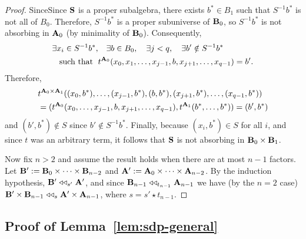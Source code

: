 \begin{proof}
{  Since}{Since}
  $\mathbf{S}$ is a proper subalgebra, there exists $b^* \in B_1$ such that 
  $S^{-1}b^*$ is not all of $B_0$.
  Therefore, $S^{-1}b^*$
  is a proper subuniverse of $\mathbf{B}_0$, so $S^{-1}b^*$ is not absorbing in $\mathbf{A}_0$
  (by minimality of $\mathbf{B}_0$). 
  Consequently,
  \begin{align*}
    \exists x_i \in S^{-1}b^*, &\quad \exists b\in B_0,
    \quad \exists j< q, \quad \exists  b'\notin S^{-1}b^* \\
    \text{ such that }  \;& t^{\mathbf{A}_0}(x_0, x_1, \dots, x_{j-1}, b, x_{j+1}, \dots, x_{q-1}) = b'.
  \end{align*}
  Therefore,
  \begin{align*}
    &t^{\bA_0\times \bA_1}((x_0,b^*), %
    \dots, (x_{j-1}, b^*), (b, b^*), (x_{j+1}, b^*), \dots, (x_{q-1}, b^*))\\
    &= (t^{\bA_0}(x_0,%
    \dots, x_{j-1}, b, x_{j+1}, \dots, x_{q-1}), t^{\bA_1}(b^*, \dots, b^*))= (b', b^*)
  \end{align*}
  and $(b', b^*)\notin S$ since $b' \notin S^{-1}b^*$.
  Finally, because $(x_i, b^*) \in S$ for all $i$, and since $t$ was an
  arbitrary term, it follows that $\mathbf{S}$ is not absorbing in $\mathbf{B}_0\times \mathbf{B}_1$.

  Now fix $n>2$ and assume the result holds when there are at most $n-1$
  factors.
  Let $\mathbf{B}' := \mathbf{B}_0 \times \cdots \times \mathbf{B}_{n-2}$ and
  $\mathbf{A}' := \mathbf{A}_0\times \cdots \times \mathbf{A}_{n-2}$. By the induction hypothesis, 
  $\mathbf{B}' \mathrel{\triangleleft\triangleleft}_{s'} \mathbf{A}'$, and since
  $\mathbf{B}_{n-1} \mathrel{\triangleleft\triangleleft}_{t_{n-1}} \mathbf{A}_{n-1}$ we have (by 
  the $n=2$ case) 
  $\mathbf{B}' \times \mathbf{B}_{n-1} \mathrel{\triangleleft\triangleleft}_s \mathbf{A}'\times \mathbf{A}_{n-1}$,
  where $s = s' \star t_{n-1}$.
\end{proof}

\subsection{Proof of Lemma~\ref{lem:sdp-general}}
\label{sec:proof-lemma-sdp-general}

